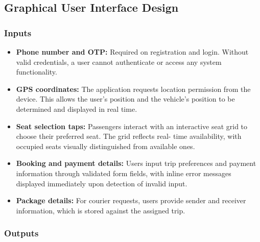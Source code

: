 \subsection{Graphical User Interface Design}

\subsubsection{Inputs}

\begin{itemize}
 \item \textbf{Phone number and OTP:} Required on registration and login.
Without valid credentials, a user cannot authenticate or access any system
functionality.

 \item \textbf{GPS coordinates:} The application requests location
permission from the device. This allows the user's position and the vehicle's
position to be determined and displayed in real time.

 \item \textbf{Seat selection taps:} Passengers interact with an
interactive seat grid to choose their preferred seat. The grid reflects real-
time availability, with occupied seats visually distinguished from available
ones.

 \item \textbf{Booking and payment details:} Users input trip preferences
and payment information through validated form fields, with inline error
messages displayed immediately upon detection of invalid input.

 \item \textbf{Package details:} For courier requests, users provide
sender and receiver information, which is stored against the assigned trip.

\end{itemize}

\subsubsection{Outputs}

